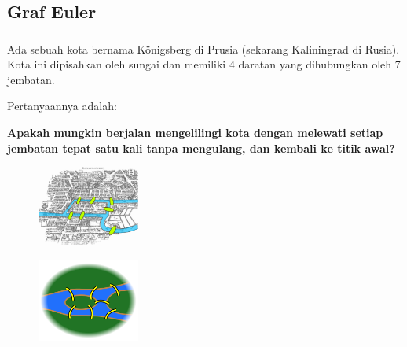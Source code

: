 \documentclass[aspectratio=169]{beamer}
\theoremstyle{definition}
\begin{document}
\subsection{Graf Euler}
\begin{frame}
  \frametitle{\insertsection}
  \framesubtitle{\insertsubsection}
  Ada sebuah kota bernama Königsberg di Prusia (sekarang Kaliningrad di Rusia). Kota ini dipisahkan oleh sungai dan memiliki 4 daratan yang dihubungkan oleh 7 jembatan.

  Pertanyaannya adalah:

  \textbf{Apakah mungkin berjalan mengelilingi kota dengan melewati setiap jembatan tepat satu kali tanpa mengulang, dan kembali ke titik awal?}
  \begin{center}
    \begin{multicols}{3}
      \begin{figure}
        \centering
        \includegraphics[width=0.3\textwidth]{Seven Bridges of Konigsberg.png}
      \end{figure}
      \begin{figure}
        \centering
        \includegraphics[width=0.3\textwidth]{Ilustrasi Jembatan.png}
      \end{figure}
      \begin{figure}
        \centering
      \end{figure}
    \end{multicols}
  \end{center}
\end{frame}
\end{document}
